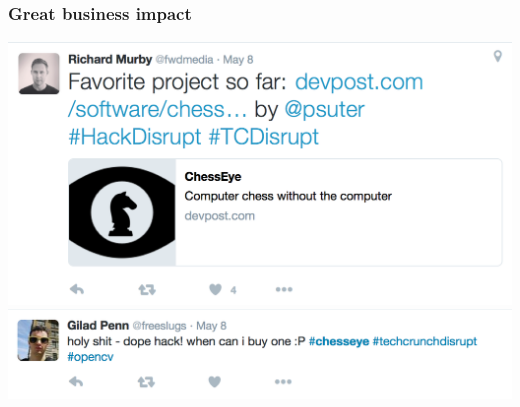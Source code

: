 \documentclass[t]{beamer}
\begin{document}
\begin{frame}[fragile]
\frametitle{Great business impact}

\begin{center}
  \includegraphics[scale=0.5]{figures/tweet1}\\
  \includegraphics[scale=0.5]{figures/tweet2}
\end{center}

\end{frame}




\end{document}
